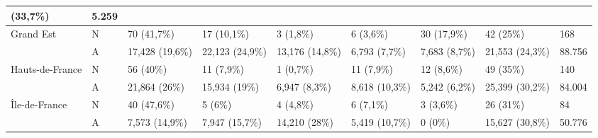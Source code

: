 \begin{table}[H]
{\begin{tabular}{|l|l|l|l|l|l|l|l|l|}
            (33,7\%)                                          & 5.259                                                                                                                                    \\ \hline
            Grand Est                                         & N               & 70 (41,7\%)                                 & 17 (10,1\%)     & 3 (1,8\%)        & 6 (3,6\%)      & 30
            (17,9\%)                                          & 42 (25\%)       & 168                                                                                                                    \\
            ~                                                 & A               & 17,428 (19,6\%)                             & 22,123 (24,9\%) & 13,176 (14,8\%)  & 6,793
            (7,7\%)                                           & 7,683 (8,7\%)   & 21,553 (24,3\%)                             & 88.756                                                                   \\ \hline
            Hauts-de-France                                   & N               & 56 (40\%)                                   & 11 (7,9\%)      & 1 (0,7\%)        & 11 (7,9\%)     &
            12 (8,6\%)                                        & 49 (35\%)       & 140                                                                                                                    \\
            ~                                                 & A               & 21,864 (26\%)                               & 15,934 (19\%)   & 6,947 (8,3\%)    & 8,618 (10,3\%) &
            5,242 (6,2\%)                                     & 25,399 (30,2\%) & 84.004                                                                                                                 \\ \hline
            Île-de-France                                     & N               & 40 (47,6\%)                                 & 5 (6\%)         & 4 (4,8\%)        & 6 (7,1\%)      & 3
            (3,6\%)                                           & 26 (31\%)       & 84                                                                                                                     \\
            ~                                                 & A               & 7,573 (14,9\%)                              & 7,947 (15,7\%)  & 14,210 (28\%)    & 5,419 (10,7\%)
                                                              & 0 (0\%)         & 15,627 (30,8\%)                             & 50.776                                                                   \\ \hline

\end{tabular}}
\end{table}
